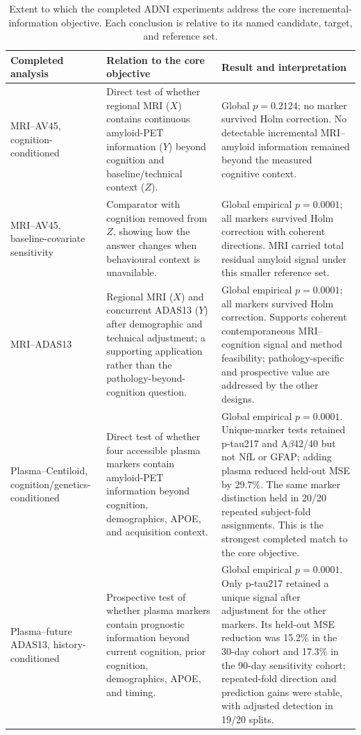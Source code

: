 \documentclass[11pt]{article}
\theoremstyle{definition}
\begin{document}
\begin{table}[!ht]
\centering
\caption{Extent to which the completed ADNI experiments address the core incremental-information
objective. Each conclusion is relative to its named candidate, target, and reference set.}
\label{tab:adni-core-objective}
\small
\begin{tabularx}{\textwidth}{>{\raggedright\arraybackslash}p{}
                              >{\raggedright\arraybackslash}X
                              >{\raggedright\arraybackslash}X}
\toprule
Completed analysis & Relation to the core objective & Result and interpretation \\
\midrule
MRI--AV45, cognition-conditioned & Direct test of whether regional MRI ($X$) contains continuous amyloid-PET information ($Y$) beyond cognition and baseline/technical context ($Z$). & Global $p=0.2124$; no marker survived Holm correction. No detectable incremental MRI--amyloid information remained beyond the measured cognitive context. \\
MRI--AV45, baseline-covariate sensitivity & Comparator with cognition removed from $Z$, showing how the answer changes when behavioural context is unavailable. & Global empirical $p=0.0001$; all markers survived Holm correction with coherent directions. MRI carried total residual amyloid signal under this smaller reference set. \\
MRI--ADAS13 & Regional MRI ($X$) and concurrent ADAS13 ($Y$) after demographic and technical adjustment; a supporting application rather than the pathology-beyond-cognition question. & Global empirical $p=0.0001$; all markers survived Holm correction. Supports coherent contemporaneous MRI--cognition signal and method feasibility; pathology-specific and prospective value are addressed by the other designs. \\
Plasma--Centiloid, cognition/genetics-conditioned & Direct test of whether four accessible plasma markers contain amyloid-PET information beyond cognition, demographics, APOE, and acquisition context. & Global empirical $p=0.0001$. Unique-marker tests retained p-tau217 and A$\beta$42/40 but not NfL or GFAP; adding plasma reduced held-out MSE by 29.7\%. The same marker distinction held in 20/20 repeated subject-fold assignments. This is the strongest completed match to the core objective. \\
Plasma--future ADAS13, history-conditioned & Prospective test of whether plasma markers contain prognostic information beyond current cognition, prior cognition, demographics, APOE, and timing. & Global empirical $p=0.0001$. Only p-tau217 retained a unique signal after adjustment for the other markers. Its held-out MSE reduction was 15.2\% in the 30-day cohort and 17.3\% in the 90-day sensitivity cohort; repeated-fold direction and prediction gains were stable, with adjusted detection in 19/20 splits. \\
\bottomrule
\end{tabularx}
\end{table}
\end{document}
